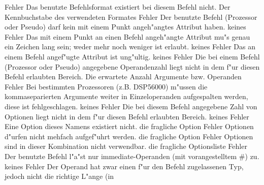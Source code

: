 \documentclass[12pt,a4paper,twoside]{report}
\begin{document}
\begin{description}
               {Fehler}
               {Das benutzte Befehlsformat existiert bei diesem
                Befehl nicht.}
               {Der Kennbuchstabe des verwendeten Formates}
               {Fehler}
               {Der benutzte Befehl (Prozessor oder Pseudo) darf
                kein mit einem Punkt angeh"angtes Attribut haben.}
               {keines}
               {Fehler}
               {Das mit einem Punkt an einen Befehl angeh"angte
                Attribut mu"s genau ein Zeichen lang sein; weder mehr noch
                weniger ist erlaubt.}
               {keines}
               {Fehler}
               {Das an einem Befehl angef"ugte Attribut ist ung"ultig.}
               {keines}
               {Fehler}
               {Die bei einem Befehl (Prozessor oder Pseudo)
                angegebene Operandenzahl liegt nicht in dem f"ur diesen
                Befehl erlaubten Bereich.}
               {Die erwartete Anzahl Argumente bzw. Operanden}
               {Fehler}
               {Bei bestimmten Prozessoren (z.B. DSP56000)
                m"ussen die kommaseparierten Argumente weiter in
                Einzeloperanden aufgespalten werden, diese ist
                fehlgeschlagen.}
               {keines}
               {Fehler}
               {Die bei diesem Befehl angegebene Zahl
	        von Optionen liegt nicht in dem f"ur diesen
                Befehl erlaubten Bereich.}
               {keines}
               {Fehler}
               {Eine Option dieses Namens existiert nicht.}
               {die fragliche Option}
               {Fehler}
               {Optionen d"urfen nicht mehfach aufgef"uhrt werden.}
               {die fragliche Option}
               {Fehler}
               {Optionen sind in dieser Kombination nicht verwendbar.}
               {die fragliche Optionsliste}
               {Fehler}
               {Der benutzte Befehl l"a"st nur
                immediate-Operanden (mit vorangestelltem \#) zu.}
               {keines}
               {Fehler}
               {Der Operand hat zwar einen f"ur den Befehl
                zugelassenen Typ, jedoch nicht die richtige L"ange (in
}
\end{description}
\end{document}
